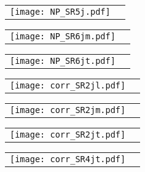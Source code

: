 \documentclass[landscape,12pt,a4paper]{article}
\begin{document}
\begin{figure}[h]\begin{center}\begin{tabular}{cc}\texttt{[image: NP\_SR5j.pdf]}\end{tabular}\end{center}\end{figure}
\begin{figure}[h]\begin{center}\begin{tabular}{cc}\texttt{[image: NP\_SR6jm.pdf]}\end{tabular}\end{center}\end{figure}
\begin{figure}[h]\begin{center}\begin{tabular}{cc}\texttt{[image: NP\_SR6jt.pdf]}\end{tabular}\end{center}\end{figure}
\clearpage
\begin{figure}[h]\begin{center}\begin{tabular}{cc}\texttt{[image: corr\_SR2jl.pdf]}\end{tabular}\end{center}\end{figure}
\begin{figure}[h]\begin{center}\begin{tabular}{cc}\texttt{[image: corr\_SR2jm.pdf]}\end{tabular}\end{center}\end{figure}
\begin{figure}[h]\begin{center}\begin{tabular}{cc}\texttt{[image: corr\_SR2jt.pdf]}\end{tabular}\end{center}\end{figure}
\begin{figure}[h]\begin{center}\begin{tabular}{cc}\texttt{[image: corr\_SR4jt.pdf]}\end{tabular}\end{center}\end{figure}
\end{document}
